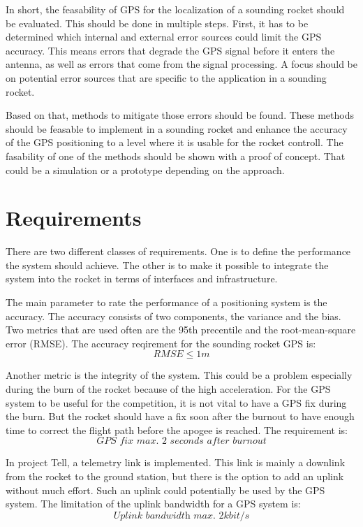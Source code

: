 In short, the feasability of GPS for the localization of a sounding rocket should be evaluated.
This should be done in multiple steps.
First, it has to be determined which internal and external error sources could limit the GPS accuracy.
This means errors that degrade the GPS signal before it enters the antenna, as well as errors that come from the signal processing.
A focus should be on potential error sources that are specific to the application in a sounding rocket.

Based on that, methods to mitigate those errors should be found.
These methods should be feasable to implement in a sounding rocket and enhance the accuracy of the GPS positioning to a level where it is usable for the rocket controll.
The fasability of one of the methods should be shown with a proof of concept.
That could be a simulation or a prototype depending on the approach.


\section{Requirements}\label{sec:requirements}

There are two different classes of requirements.
One is to define the performance the system should achieve.
The other is to make it possible to integrate the system into the rocket in terms of interfaces and infrastructure.

The main parameter to rate the performance of a positioning system is the accuracy.
The accuracy consists of two components, the variance and the bias.
Two metrics that are used often are the 95th precentile and the root-mean-square error (RMSE).
The accuracy reqirement for the sounding rocket GPS is:
$$ RMSE \le 1m $$

Another metric is the integrity of the system.
This could be a problem especially during the burn of the rocket because of the high acceleration.
For the GPS system to be useful for the competition, it is not vital to have a GPS fix during the burn.
But the rocket should have a fix soon after the burnout to have enough time to correct the flight path before the apogee is reached.
The requirement is:
$$ \textit{GPS fix max. 2 seconds after burnout} $$

In project Tell, a telemetry link is implemented.
This link is mainly a downlink from the rocket to the ground station, but there is the option to add an uplink without much effort.
Such an uplink could potentially be used by the GPS system.
The limitation of the uplink bandwidth for a GPS system is:
$$ \textit{Uplink bandwidth max. 2kbit/s} $$